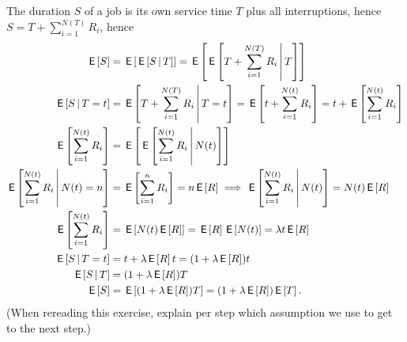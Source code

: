 \begin{exercise}
\begin{solution}
The  duration $S$ of a job  is its own service time $T$ plus all interruptions, hence $S = T+ \sum_{i=1}^{N(T)} R_{i}$, hence
\begin{align}
\E S &= \E{\E{S\given T}}   = \E{\E{T + \sum_{i=1}^{N(T)} R_{i}\given T}} \\
\E{S\given T = t} &= \E{T + \sum_{i=1}^{N(T)} R_{i}\given T=t} = \E{t + \sum_{i=1}^{N(t)} R_{i}} = t + \E{\sum_{i=1}^{N(t)} R_{i}} \\
\E{\sum_{i=1}^{N(t)} R_{i}}  &= \E{\E{\sum_{i=1}^{N(t)} R_{i}\given N(t)}}\\
\E{\sum_{i=1}^{N(t)} R_{i}\given N(t)= n} &= \E{\sum_{i=1}^{n} R_{i}} = n \E R  \implies \E{\sum_{i=1}^{N(t)} R_{i}\given N(t)} = N(t) \E R \\
\E{\sum_{i=1}^{N(t)} R_{i}} &= \E{N(t) \E R} = \E R \E{N(t)} = \lambda t \E R\\
\E{S \given T=t} &= t + \lambda \E R t = (1+\lambda \E R) t \\
\E{S \given T} &= (1+\lambda \E R) T \\
\E S  &= \E{(1 + \lambda \E R )T} = (1+\lambda \E R) \E T.
\end{align}
(When rereading this exercise, explain per step which assumption we use to get to the next step.)


\end{solution}
\end{exercise}
